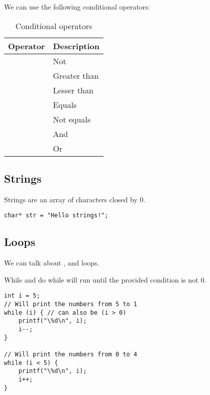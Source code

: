 We can use the following conditional operators:

\begin{table}[h]
    \centering
    \begin{tabular}{|p{}|p{}|}
        \hline
        \textbf{Operator}   & \textbf{Description}  \\
        \hline
        \ascode{!}          & Not \\
        \ascode{>}          & Greater than \\
        \ascode{<}          & Lesser than \\
        \ascode{==}         & Equals \\
        \ascode{!=}         & Not equals \\
        \ascode{\&\&}       & And \\
        \ascode{||}         & Or \\
        \hline

    \end{tabular}
    \caption{Conditional operators}\label{table:conditional-operators}
\end{table}


\subsection{Strings}
Strings are an array of characters closed by 0.

\begin{lstlisting}[style=CStyle,caption={Strings}]
char* str = "Hello strings!";

\end{lstlisting}


\newpage
\subsection{Loops}
We can talk about ,  and  loops.

While and do while will run until the provided condition is not 0.

\begin{lstlisting}[style=CStyle,caption={While loop}]
int i = 5;
// Will print the numbers from 5 to 1
while (i) { // can also be (i > 0)
    printf("\%d\n", i);
    i--;
}

// Will print the numbers from 0 to 4
while (i < 5) {
    printf("\%d\n", i);
    i++;
}

\end{lstlisting}

